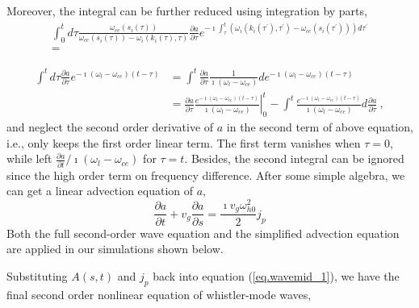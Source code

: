 Moreover, the integral can be further reduced using integration by parts, 
\begin{equation}
    \begin{aligned}
    \int_0^t d \tau \frac{\omega_{c e}\left(s_i(\tau)\right)}{\omega_{c e}\left(s_i(\tau)\right)-\omega_i\left(k_i(\tau), \tau\right)} \frac{\partial a}{\partial \tau} e^{-\imath \int_\tau^t\left(\omega_i\left(k_i\left(\tau^{\prime}\right), \tau^{\prime}\right)-\omega_{c e}\left(s_i\left(\tau^{\prime}\right)\right)\right) d \tau^{\prime}} \\
    = 
\end{aligned}
\end{equation}

\begin{equation}
\begin{aligned}
    \int^{t} d \tau \frac{\partial a}{\partial \tau} e^{-\imath\left(\omega_{l}-\omega_{c e}\right)(t-\tau)}
    &=\int^{t}\frac{\partial a}{\partial\tau} \frac{1}{\imath\left(\omega_l-\omega_{ce}\right)}d e^{-\imath\left(\omega_l-\omega_{ce}\right)\left(t-\tau\right)}
    \\
    &=\left.\frac{\partial a}{\partial \tau}\frac{e^{-\imath\left(\omega_l-\omega_{ce}\right)\left(t-\tau\right)}}{\imath\left(\omega_l-\omega_{ce}\right)}\right|^{t}_{0} - \int^{t} \frac{e^{-\imath\left(\omega_l-\omega_{ce}\right)\left(t-\tau\right)}}{\imath\left(\omega_l-\omega_{ce}\right)}d \frac{\partial a}{\partial\tau}~,
    \end{aligned}
\end{equation}
and neglect the second order derivative of $a$ in the second term of above equation, i.e., only keeps the first order linear term. The first term vanishes when $\tau = 0$, while left $\frac{\partial a}{\partial t}/\imath\left(\omega_{l}-\omega_{ce}\right)$ for $\tau = t$. Besides, the second integral can be ignored since the high order term on frequency difference. After some simple algebra, we can get a linear advection equation of $a$,
\begin{equation}
    \label{eq.adv}
    \frac{\partial a}{\partial t} +v_g \frac{\partial a}{\partial s} =\frac{\imath v_g \omega_{h 0}^{2}}{2} j_p
\end{equation}
Both the full second-order wave equation and the simplified advection equation are applied in our simulations shown below.


Substituting $A(s,t)$ and $j_p$ back into equation (\ref{eq.wavemid_1}), we have the final second order nonlinear equation of whistler-mode waves,

